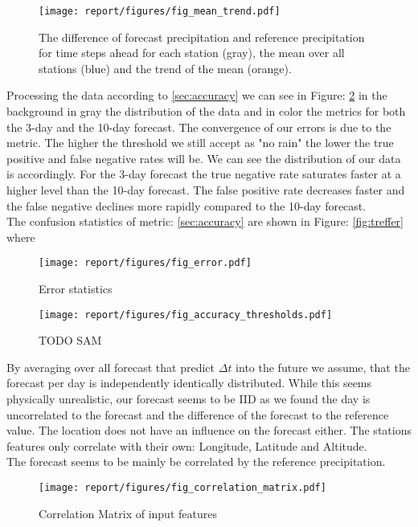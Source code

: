\documentclass{article}
\theoremstyle{plain}
\theoremstyle{definition}
\theoremstyle{remark}
\begin{document}
\begin{figure}[h]
\centering
\label{fig:mean_trend}
\texttt{[image: report/figures/fig\_mean\_trend.pdf]}
\caption{The difference of forecast precipitation and reference precipitation for time steps ahead for each station (gray), the mean over all stations (blue) and the trend of the mean (orange). }
\end{figure}
  Processing the data according to \ref{sec:accuracy} we can see in Figure: \ref{fig:error} in the background in gray the distribution of the data and in color the metrics for both the 3-day and the  10-day forecast. The convergence of our errors is due to the metric. The higher the threshold we still accept as "no rain" the lower the true positive and false negative rates will be. We can see the distribution of our data is accordingly. For the 3-day forecast the true negative rate saturates faster at a higher level than the 10-day forecast. The false positive rate decreases faster and the false negative declines more rapidly compared to the 10-day forecast.\\ 
The confusion statistics of metric: \ref{sec:accuracy} are shown in Figure: \ref{fig:treffer} where 
\begin{figure}[h]
\centering
\label{fig:error}
\texttt{[image: report/figures/fig\_error.pdf]}
\caption{Error statistics}
\end{figure}

\begin{figure}[h]
\centering
\label{fig:accuracy}
\texttt{[image: report/figures/fig\_accuracy\_thresholds.pdf]}
\caption{TODO SAM}
\end{figure}


By averaging over all forecast that predict $\Delta t$ into the future we assume, that the forecast per day is independently identically distributed. While this seems physically unrealistic, our forecast seems to be IID as we found the day is uncorrelated to the forecast and the difference of the forecast to the reference value. The location does not have an influence on the forecast either. The stations features only correlate with their own: Longitude, Latitude and Altitude. \\
The forecast seems to be mainly be correlated by the reference precipitation. 
\begin{figure}[h]
\centering
\label{fig:corr_matrix}
\texttt{[image: report/figures/fig\_correlation\_matrix.pdf]}
\caption{Correlation Matrix of input features}
\end{figure}
\end{document}
